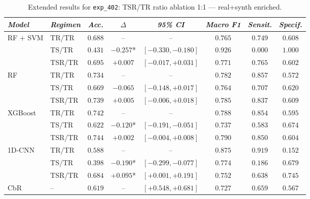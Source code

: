 \begin{table}[H]
\centering
\scriptsize
\caption{Extended results for \texttt{exp\_402}: TSR/TR ratio ablation 1:1 — real+synth enriched.}
\label{tab:appendix_exp_402}
\begin{tabular*}{\textwidth}{@{\extracolsep{\fill}}llcccccc}
\toprule
\emph{Model} & \emph{Regimen} & \emph{Acc.} & \emph{$\Delta$} & \emph{95\% CI} & \emph{Macro F1} & \emph{Sensit.} & \emph{Specif.}\\
\midrule
\multirow{3}{*}{RF + SVM} & TR/TR & $0.688$ & -- & -- & $0.765$ & $0.749$ & $0.608$\\
 & TS/TR & $0.431$ & $-0.257$* & $[-0.330, -0.180]$ & $0.926$ & $0.000$ & $1.000$\\
 & TSR/TR & $0.695$ & $+0.007$ & $[-0.017, +0.031]$ & $0.771$ & $0.765$ & $0.602$\\
\midrule
\multirow{3}{*}{RF} & TR/TR & $0.734$ & -- & -- & $0.782$ & $0.857$ & $0.572$\\
 & TS/TR & $0.669$ & $-0.065$ & $[-0.148, +0.017]$ & $0.764$ & $0.707$ & $0.620$\\
 & TSR/TR & $0.739$ & $+0.005$ & $[-0.006, +0.018]$ & $0.785$ & $0.837$ & $0.609$\\
\midrule
\multirow{3}{*}{XGBoost} & TR/TR & $0.742$ & -- & -- & $0.788$ & $0.854$ & $0.595$\\
 & TS/TR & $0.622$ & $-0.120$* & $[-0.191, -0.051]$ & $0.737$ & $0.583$ & $0.674$\\
 & TSR/TR & $0.744$ & $+0.002$ & $[-0.004, +0.008]$ & $0.790$ & $0.850$ & $0.604$\\
\midrule
\multirow{3}{*}{1D-CNN} & TR/TR & $0.588$ & -- & -- & $0.875$ & $0.919$ & $0.152$\\
 & TS/TR & $0.398$ & $-0.190$* & $[-0.299, -0.077]$ & $0.774$ & $0.186$ & $0.679$\\
 & TSR/TR & $0.684$ & $+0.095$* & $[+0.001, +0.191]$ & $0.752$ & $0.638$ & $0.745$\\
\midrule
CbR & -- & $0.619$ & -- & $[+0.548, +0.681]$ & $0.727$ & $0.659$ & $0.567$\\
\bottomrule
\end{tabular*}
\end{table}

